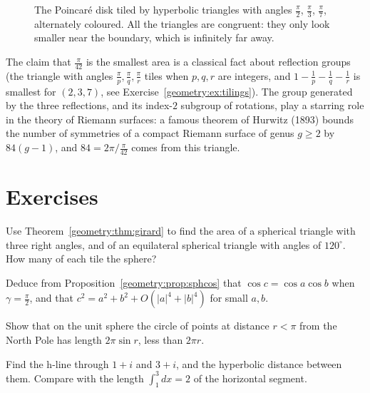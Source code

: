 \begin{figure}[ht]
\centering
{}
\caption{The Poincar\'e disk tiled by hyperbolic triangles with angles $\frac\pi2$, $\frac\pi3$, $\frac\pi7$, alternately coloured. All the triangles are
congruent: they only look smaller near the boundary, which is infinitely far away.}
\label{geometry:fig:tiling}
\end{figure}

\begin{remark}
The claim that $\frac\pi{42}$ is the smallest area is a classical fact about reflection groups (the triangle with angles $\frac\pi p,\frac\pi q,\frac\pi r$ tiles
when $p,q,r$ are integers, and $1-\frac1p-\frac1q-\frac1r$ is smallest for $(2,3,7)$, see Exercise~\ref{geometry:ex:tilings}). The group generated by the three
reflections, and its index-$2$ subgroup of rotations, play a starring role in the theory of Riemann surfaces: a famous theorem of Hurwitz (1893) bounds
the number of symmetries of a compact Riemann surface of genus $g\ge2$ by $84(g-1)$, and $84=2\pi/\frac\pi{42}$ comes from this triangle.
\end{remark}

\section{Exercises}

\begin{exercise}[$\star$]\label{geometry:ex:lune}
Use Theorem~\ref{geometry:thm:girard} to find the area of a spherical triangle with three right angles, and of an equilateral spherical triangle with angles of
$120^\circ$. How many of each tile the sphere?
\end{exercise}

\begin{exercise}[$\star$]\label{geometry:ex:sphpythag}
Deduce from Proposition~\ref{geometry:prop:sphcos} that $\cos c=\cos a\cos b$ when $\gamma=\frac\pi2$, and that $c^2=a^2+b^2+O(|a|^4+|b|^4)$ for small $a,b$.
\end{exercise}

\begin{exercise}[$\star$]\label{geometry:ex:sphcircle}
Show that on the unit sphere the circle of points at distance $r<\pi$ from the North Pole has length $2\pi\sin r$, less than $2\pi r$.
\end{exercise}

\begin{exercise}[$\star$]\label{geometry:ex:hpdist}
Find the h-line through $1+i$ and $3+i$, and the hyperbolic distance between them. Compare with the length $\int_1^3dx=2$ of the horizontal segment.
\end{exercise}

